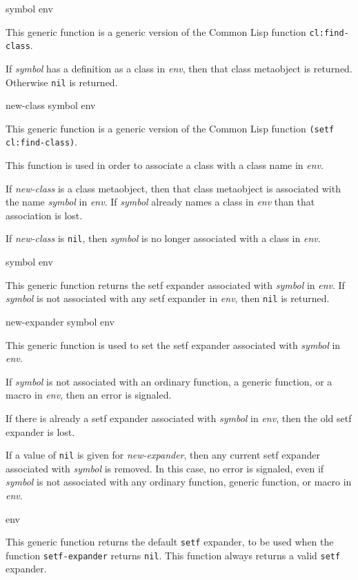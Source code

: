  {symbol env}

This generic function is a generic version of the Common Lisp
function \texttt{cl:find-class}.

If \textit{symbol} has a definition as a class in \textit{env}, then that
class metaobject is returned.  Otherwise \texttt{nil} is returned.

 {new-class symbol env}

This generic function is a generic version of the Common Lisp
function \texttt{(setf cl:find-class)}.

This function is used in order to associate a class with a class
name in \textit{env}.

If \textit{new-class} is a class metaobject, then that class
metaobject is associated with the name \textit{symbol}
in \textit{env}.  If \textit{symbol} already names a class
in \textit{env} than that association is lost.

If \textit{new-class} is \texttt{nil}, then \textit{symbol} is no
longer associated with a class in \textit{env}.

 {symbol env}

This generic function returns the setf expander associated with
\textit{symbol} in \textit{env}.  If \textit{symbol} is not associated
with any setf expander in \textit{env}, then \texttt{nil} is returned.

 {new-expander symbol env}

This generic function is used to set the setf expander associated
with \textit{symbol} in \textit{env}.

If \textit{symbol} is not associated with an ordinary function, a generic
function, or a macro in \textit{env}, then an error is signaled.

If there is already a setf expander associated with \textit{symbol} in
\textit{env}, then the old setf expander is lost.

If a value of \texttt{nil} is given for \textit{new-expander}, then
any current setf expander associated with \textit{symbol} is removed.
In this case, no error is signaled, even if \textit{symbol} is not
associated with any ordinary function, generic function, or macro
in \textit{env}.

 {env}

This generic function returns the default \texttt{setf} expander, to
be used when the function \texttt{setf-expander} returns \texttt{nil}.
This function always returns a valid \texttt{setf} expander.

